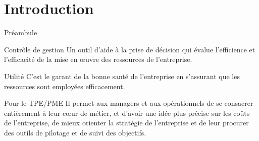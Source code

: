 \documentclass[french]{beamer}
\begin{document}
\section{Introduction}
\begin{frame}{Préambule}




	\begin{exampleblock}{Contrôle de gestion}
	Un outil d’aide à la prise de décision qui évalue l’efficience et l’efficacité de la mise en œuvre des ressources de l’entreprise.
	\end{exampleblock}
	
\pause	
	
	\begin{exampleblock}{Utilité}
	C'est le garant de la bonne santé de l'entreprise en s'assurant que les ressources sont employées efficacement.
	\end{exampleblock}
	
\pause	
	
	\begin{exampleblock}{Pour le TPE/PME}
	  Il permet aux managers et aux opérationnels de se consacrer entièrement à leur cœur de métier,  et d'avoir une idée plus précise sur les coûts de l’entreprise, de mieux orienter la stratégie de l’entreprise et de leur procurer des outils de pilotage et de suivi des objectifs.

	 \end{exampleblock}
	
	
\end{frame}
\end{document}
